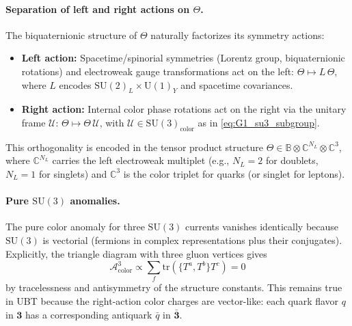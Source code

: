\paragraph{Separation of left and right actions on \texorpdfstring{$\Theta$}{Theta}.}
The biquaternionic structure of $\Theta$ naturally factorizes its symmetry actions:
\begin{itemize}
\item \textbf{Left action:} Spacetime/spinorial symmetries (Lorentz group, biquaternionic rotations) and electroweak gauge transformations act on the left: $\Theta \mapsto L\,\Theta$, where $L$ encodes $\mathrm{SU}(2)_L \times \mathrm{U}(1)_Y$ and spacetime covariances.
\item \textbf{Right action:} Internal color phase rotations act on the right via the unitary frame $\mathcal{U}$: $\Theta \mapsto \Theta\,\mathcal{U}$, with $\mathcal{U}\in\mathrm{SU}(3)_{\mathrm{color}}$ as in \eqref{eq:G1_su3_subgroup}.
\end{itemize}
This orthogonality is encoded in the tensor product structure $\Theta \in \mathbb{B}\otimes \mathbb{C}^{N_L} \otimes \mathbb{C}^3$, where $\mathbb{C}^{N_L}$ carries the left electroweak multiplet (e.g., $N_L=2$ for doublets, $N_L=1$ for singlets) and $\mathbb{C}^3$ is the color triplet for quarks (or singlet for leptons).

\paragraph{Pure \texorpdfstring{$\mathrm{SU}(3)$}{SU(3)} anomalies.}
The pure color anomaly for three $\mathrm{SU}(3)$ currents vanishes identically because $\mathrm{SU}(3)$ is vectorial (fermions in complex representations plus their conjugates). Explicitly, the triangle diagram with three gluon vertices gives
\begin{equation}
\mathcal{A}_{\mathrm{color}}^3 \propto \sum_f \mathrm{tr}(\{T^a,T^b\}T^c) = 0
\end{equation}
by tracelessness and antisymmetry of the structure constants. This remains true in UBT because the right-action color charges are vector-like: each quark flavor $q$ in $\mathbf{3}$ has a corresponding antiquark $\bar{q}$ in $\bar{\mathbf{3}}$.


